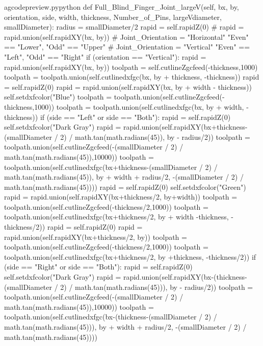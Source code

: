 \documentclass{ltxdoc}
\begin{document}
\begin{writecode}{a}{gcodepreview.py}{python}
    def Full_Blind_Finger_Joint_largeV(self, bx, by, orientation, side, width, thickness, Number_of_Pins, largeVdiameter, smallDiameter):
        radius = smallDiameter/2
        rapid = self.rapidZ(0)
#        rapid = rapid.union(self.rapidXY(bx, by))
#     Joint_Orientation = "Horizontal" "Even" == "Lower", "Odd" == "Upper"
#     Joint_Orientation = "Vertical" "Even" == "Left", "Odd" == "Right"
        if (orientation == "Vertical"):
            rapid = rapid.union(self.rapidXY(bx, by))
            toolpath = self.cutlineZgcfeed(-thickness,1000)
            toolpath = toolpath.union(self.cutlinedxfgc(bx, by + thickness, -thickness))
            rapid = self.rapidZ(0)
            rapid = rapid.union(self.rapidXY(bx, by + width - thickness))
            self.setdxfcolor("Blue")
            toolpath = toolpath.union(self.cutlineZgcfeed(-thickness,1000))
            toolpath = toolpath.union(self.cutlinedxfgc(bx, by + width, -thickness))
            if (side == "Left" or side == "Both"):
                rapid = self.rapidZ(0)
                self.setdxfcolor("Dark Gray")
                rapid = rapid.union(self.rapidXY(bx+thickness-(smallDiameter / 2) / math.tan(math.radians(45)), by - radius/2))
                toolpath = toolpath.union(self.cutlineZgcfeed(-(smallDiameter / 2) / math.tan(math.radians(45)),10000))
                toolpath = toolpath.union(self.cutlinedxfgc(bx+thickness-(smallDiameter / 2) / math.tan(math.radians(45)), by + width + radius/2, -(smallDiameter / 2) / math.tan(math.radians(45))))
                rapid = self.rapidZ(0)
                self.setdxfcolor("Green")
                rapid = rapid.union(self.rapidXY(bx+thickness/2, by+width))
                toolpath = toolpath.union(self.cutlineZgcfeed(-thickness/2,1000))
                toolpath = toolpath.union(self.cutlinedxfgc(bx+thickness/2, by + width -thickness, -thickness/2))
                rapid = self.rapidZ(0)
                rapid = rapid.union(self.rapidXY(bx+thickness/2, by))
                toolpath = toolpath.union(self.cutlineZgcfeed(-thickness/2,1000))
                toolpath = toolpath.union(self.cutlinedxfgc(bx+thickness/2, by +thickness, -thickness/2))
            if (side == "Right" or side == "Both"):
                rapid = self.rapidZ(0)
                self.setdxfcolor("Dark Gray")
                rapid = rapid.union(self.rapidXY(bx-(thickness-(smallDiameter / 2) / math.tan(math.radians(45))), by - radius/2))
                toolpath = toolpath.union(self.cutlineZgcfeed(-(smallDiameter / 2) / math.tan(math.radians(45)),10000))
                toolpath = toolpath.union(self.cutlinedxfgc(bx-(thickness-(smallDiameter / 2) / math.tan(math.radians(45))), by + width + radius/2, -(smallDiameter / 2) / math.tan(math.radians(45))))

\end{writecode}
\end{document}
